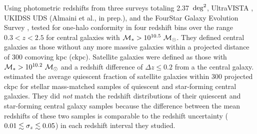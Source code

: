 



Using photometric redshifts from three surveys totaling 2.37~$\degsq$,
UltraVISTA \citep{McCracken12},
UKIDSS \citep{Lawrence07} UDS (Almaini et al., in prep.),
and the FourStar Galaxy Evolution Survey \citep[ZFOURGE;][]{Spitler12},
\citet{Kawinwanichakij16} tested for one-halo conformity in four redshift bins over the range ${0.3 < z < 2.5}$ for central galaxies with ${\mstar>10^{10.5}~\msun}$.
They defined central galaxies as those without any more massive galaxies within a projected distance of 300 comoving kpc (ckpc).
Satellite galaxies were defined as those with ${\mstar>10^{10.2}~\msun}$ and a redshift difference of ${\Delta z \le 0.2}$ from a the central galaxy.
\citet{Kawinwanichakij16} estimated the average quiescent fraction of satellite galaxies within 300 projected ckpc for stellar mass-matched samples of quiescent and star-forming central galaxies.
They did \emph{not} match the redshift distributions of their quiescent and star-forming central galaxy samples because the difference between the mean redshifts of these two samples is comparable to the redshift uncertainty (${0.01 \lesssim \sigmaz \lesssim 0.05}$) in each redshift interval they studied.

